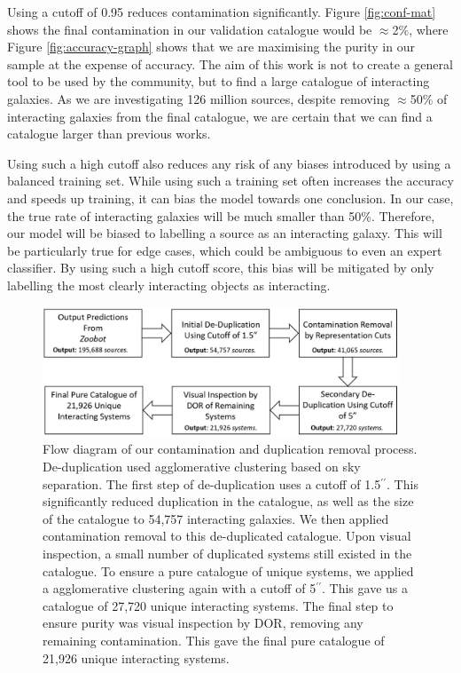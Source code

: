Using a cutoff of 0.95 reduces contamination significantly. Figure \ref{fig:conf-mat} shows the final contamination in our validation catalogue would be $\approx$2\%, where Figure \ref{fig:accuracy-graph} shows that we are maximising the purity in our sample at the expense of accuracy. The aim of this work is not to create a general tool to be used by the community, but to find a large catalogue of interacting galaxies. As we are investigating 126 million sources, despite removing $\approx$50\% of interacting galaxies from the final catalogue, we are certain that we can find a catalogue larger than previous works.

Using such a high cutoff also reduces any risk of any biases introduced by using a balanced training set. While using such a training set often increases the accuracy and speeds up training, it can bias the model towards one conclusion. In our case, the true rate of interacting galaxies will be much smaller than 50\%. Therefore, our model will be biased to labelling a source as an interacting galaxy. This will be particularly true for edge cases, which could be ambiguous to even an expert classifier. By using such a high cutoff score, this bias will be mitigated by only labelling the most clearly interacting objects as interacting.

\begin{figure}
    \centering
    \includegraphics[width=0.95\textwidth]{Chapter2/figures/fig6.jpg}
    \caption[Flow diagram of our contamination and duplication removal process.]{Flow diagram of our contamination and duplication removal process. De-duplication used agglomerative clustering based on sky separation. The first step of de-duplication uses a cutoff of 1.5$^{\prime\prime}$. This significantly reduced duplication in the catalogue, as well as the size of the catalogue to 54,757 interacting galaxies. We then applied contamination removal to this de-duplicated catalogue. Upon visual inspection, a small number of duplicated systems still existed in the catalogue. To ensure a pure catalogue of unique systems, we applied a agglomerative clustering again with a cutoff of 5$^{\prime\prime}$. This gave us a catalogue of 27,720 unique interacting systems. The final step to ensure purity was visual inspection by DOR, removing any remaining contamination. This gave the final pure catalogue of 21,926 unique interacting systems.}
    \label{fig:flow-diagram}
\end{figure}

